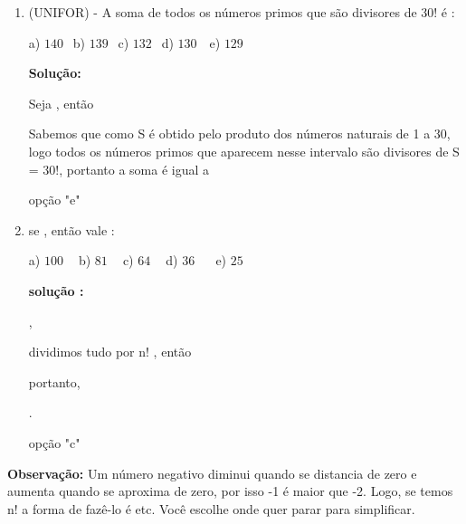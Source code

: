 \begin{multicols*}{2}
\begin{enumerate}
\begin{enumerate}
					\\
					
					\\
					
					\\

					
		\item (UNIFOR) - A soma de todos os números primos que são divisores de 30! é :

	a) $140 \ \ $ b) $139 \ \ $ c) $132 \ \ $ d) $130 \ \ \ $ e) $129 \ \ $

\textbf{Solução:}

Seja , então


Sabemos que como S é obtido pelo produto dos números naturais de 1 a 30, logo todos os números primos que aparecem nesse intervalo são divisores de S = 30!, portanto a soma  é igual a



opção "e"

	\item se , então  vale :

	a) $100 \ \ \ \ $ b) $81 \ \ \ \ $ c) $64 \ \ \ \ $ d) $36 \ \ \ \ \ \ $ e) $25 \ \ $

\textbf{solução :}


,

dividimos tudo por n! , então


portanto, 

.

opção "c"

		\end{enumerate}

					\textbf{Observação:} Um número negativo diminui quando se distancia de zero e aumenta quando se aproxima de zero, por isso -1 é maior que -2. Logo, se temos n! a forma de fazê-lo é  etc. Você escolhe onde quer parar para simplificar.


\end{enumerate}
\end{multicols*}
